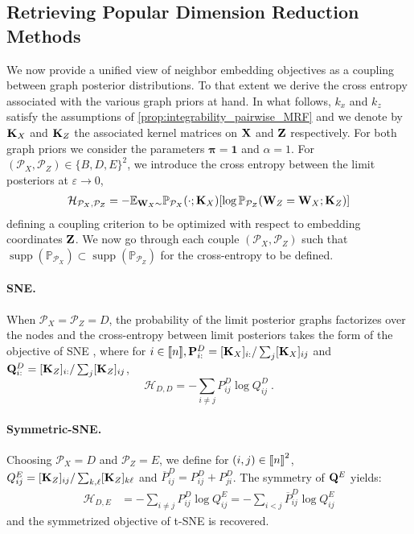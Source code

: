 \subsection{Retrieving Popular Dimension Reduction Methods}\label{sec:retrieving_DR_methods}

We now provide a unified view of neighbor embedding objectives as a coupling between graph posterior distributions. To that extent we derive the cross entropy associated with the various graph priors at hand. In what follows, $k_x$ and $k_z$ satisfy the assumptions of \cref{prop:integrability_pairwise_MRF} and we denote by $\mathbf{K}_{X}$ and $\mathbf{K}_{Z}$ the associated kernel matrices on  $\mathbf{X}$ and $\mathbf{Z}$ respectively. For both graph priors we consider the parameters $\bm{\pi}=\bm{1}$ and $\alpha=1$. For $(\mathcal{P}_{X}, \mathcal{P}_{Z}) \in \{B,D,E\}^2$, we introduce the 
cross entropy between the limit posteriors at $\varepsilon \to 0$,
\begin{align*}
    \mathcal{H}_{\mathcal{P}_X, \mathcal{P}_Z} = - \mathbb{E}_{\mathbf{W}_{X} \sim }\mathbb{P}_{\mathcal{P}_X}(\cdot;\mathbf{K}_X)[\log \mathbb{P}_{\mathcal{P}_{Z}}(\mathbf{W}_{Z} = \mathbf{W}_{X}; \mathbf{K}_{Z})]
\end{align*}
defining a coupling criterion to be optimized with respect to embedding coordinates $\mathbf{Z}$. We now go through each couple $(\mathcal{P}_{X}, \mathcal{P}_{Z})$ such that $\operatorname{supp}\left(\mathbb{P}_{\mathcal{P}_X}\right) \subset \operatorname{supp}\left(\mathbb{P}_{\mathcal{P}_Z}\right)$ for the cross-entropy to be defined.

\paragraph{SNE.}
When $\mathcal{P}_{X} = \mathcal{P}_{Z} = D$, the probability of the limit posterior graphs factorizes over the nodes and the cross-entropy between limit posteriors takes the form of the objective of SNE \cite{hinton2002stochastic}, where for $i \in {[\![n]\!]},\mathbf{P}^{D}_{i:} = [\mathbf{K}_X]_{i:} / \sum_j [\mathbf{K}_X]_{ij}$ and $\mathbf{Q}^{D}_{i:} = [\mathbf{K}_{Z}]_{i:} / \sum_j [\mathbf{K}_Z]_{ij}$,
$$\mathcal{H}_{D,D}= - \sum_{i \neq j} P^{D}_{ij} \log Q^{D}_{ij} \:.$$

\paragraph{Symmetric-SNE.}
Choosing $\mathcal{P}_{X} = D$ and $\mathcal{P}_{Z} = E$, we define for $(i,j) \in {[\![n]\!]}^2$, $Q^{E}_{ij} = [\mathbf{K}_Z]_{ij} / \sum_{k,\ell}[\mathbf{K}_Z]_{k\ell}$ and $\overline{P}^{D}_{ij} = P^{D}_{ij} + P^{D}_{ji}$. The symmetry of $\mathbf{Q}^{E}$ yields:
\begin{align*}
    \mathcal{H}_{D,E} &= - \sum_{i \neq j} P^{D}_{ij} \log Q^{E}_{ij} = - \sum_{i < j} \overline{P}^{D}_{ij} \log Q^{E}_{ij}
\end{align*}
and the symmetrized objective of t-SNE \cite{maaten2008tSNE} is recovered. 

